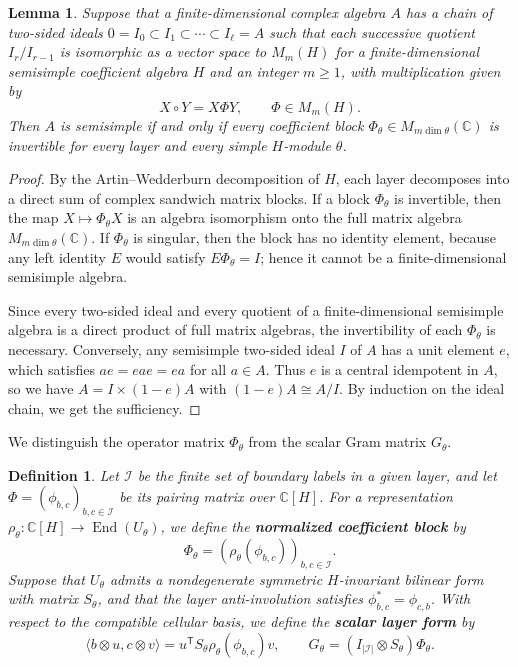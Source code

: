 \documentclass[11pt,a4paper]{amsart}
\newtheorem{lemma}[theorem]{Lemma}
\theoremstyle{uprightdefinition}
\newtheorem{definition}[theorem]{Definition}
\theoremstyle{remark}\newtheorem{remark}[theorem]{Remark}
\begin{document}
\begin{lemma}\label{lem:sandwich-layers}
Suppose that a finite-dimensional complex algebra $A$ has a chain of two-sided ideals
$0=I_0\subset I_1\subset\cdots\subset I_\ell=A$
such that each successive quotient $I_r/I_{r-1}$ is isomorphic as a vector space to $M_m(H)$ for a finite-dimensional
semisimple coefficient algebra $H$ and an integer $m\ge1$, with multiplication given by
\[
 X\circ Y=X\Phi Y,\qquad \Phi\in M_m(H).
\]
Then $A$ is semisimple if and only if every coefficient block
$\Phi_\theta\in M_{m\dim\theta}(\mathbb C)$ is invertible
for every layer and every simple $H$-module $\theta$.
\end{lemma}
\begin{proof}
By the Artin--Wedderburn decomposition of $H$, each layer decomposes into a direct sum
of complex sandwich matrix blocks. If a block $\Phi_\theta$ is invertible, then the map $X\mapsto\Phi_\theta X$ is an algebra isomorphism onto the full
matrix algebra $M_{m\dim\theta}(\mathbb C)$.
If $\Phi_\theta$ is singular, then the block has no identity element, because any left identity $E$ would
satisfy $E\Phi_\theta=I$; hence it cannot be a finite-dimensional
semisimple algebra.

Since every two-sided ideal and every quotient of a finite-dimensional semisimple algebra is a direct product of full matrix algebras, the invertibility of each $\Phi_\theta$ is necessary. Conversely, any semisimple two-sided ideal $I$ of $A$ has a unit element $e$, which satisfies $ae=eae=ea$ for all $a\in A$. Thus $e$ is a central idempotent in $A$, so we have
$A=I\times(1-e)A$ with $(1-e)A\cong A/I$. By induction on the ideal
chain, we get the sufficiency.
\end{proof}

We distinguish the operator matrix $\Phi_\theta$ from the scalar Gram matrix $G_\theta$.

\begin{definition}\label{def:coefficient-forms}
Let $\mathcal I$ be the finite set of boundary labels in a given layer,
and let $\Phi=(\phi_{b,c})_{b,c\in\mathcal I}$ be its pairing matrix over
$\mathbb C[H]$. For a representation $\rho_\theta: \mathbb C[H]\to\operatorname{End}(U_\theta)$, we define the \textbf{normalized coefficient block} by
\[
 \Phi_\theta=(\rho_\theta(\phi_{b,c}))_{b,c\in\mathcal I}.
\]
Suppose that $U_\theta$ admits a nondegenerate symmetric $H$-invariant bilinear form
with matrix $S_\theta$, and that the layer anti-involution satisfies
$\phi_{b,c}^*=\phi_{c,b}$. With respect to the compatible cellular basis, we define the
\textbf{scalar layer form} by
\[
 \langle b\otimes u,c\otimes v\rangle
   =u^{\mathsf T}S_\theta\rho_\theta(\phi_{b,c})v,
 \qquad
 G_\theta=(I_{|\mathcal I|}\otimes S_\theta)\Phi_\theta.
\]
\end{definition}
\end{document}

